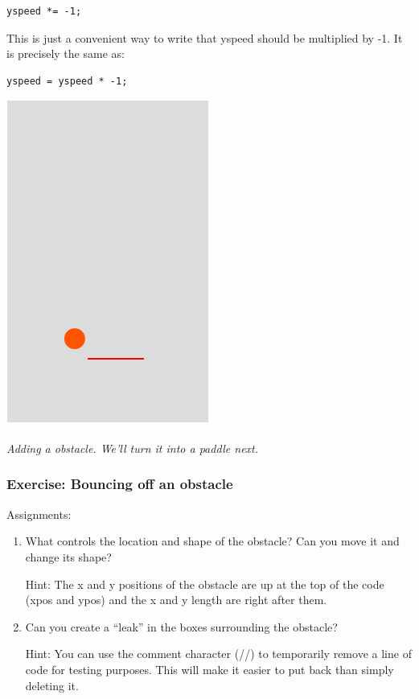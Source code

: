\documentclass[11pt]{article}
\newcommand{\capt}[1]{\begin{minipage}{0.75\columnwidth}\itshape#1\end{minipage}}
\begin{document}
\begin{verbatim}
yspeed *= -1;
\end{verbatim}

This is just a convenient way to write that yspeed should be
multiplied by -1.  It is precisely the same as:

\begin{verbatim}
yspeed = yspeed * -1;
\end{verbatim}

\begin{center}
\includegraphics[width=0.5\columnwidth]{game-obstacle.png}

\capt{Adding a obstacle.  We'll turn it into a paddle next.}
\end{center}


\subsubsection{Exercise: Bouncing off an obstacle}

Assignments:

\begin{enumerate}

\item What controls the location and shape of the obstacle?  Can you
  move it and change its shape?

Hint: The x and y positions of the obstacle are up at the top of the
code (xpos and ypos) and the x and y length are right after them.

\item Can you create a ``leak'' in the boxes surrounding the obstacle?

Hint: You can use the comment character (//) to temporarily remove a
line of code for testing purposes.  This will make it easier to put
back than simply deleting it.

\end{enumerate}
\end{document}

